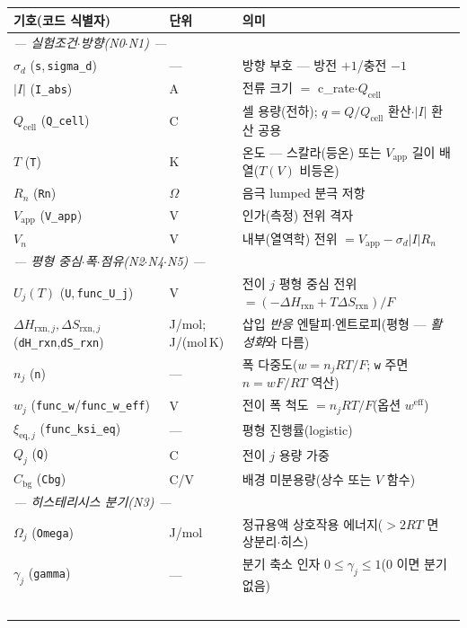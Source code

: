 \documentclass[11pt,a4paper]{article}
\newcommand{\eff}{\mathrm{eff}}
\newcommand{\eq}{\mathrm{eq}}
\newcommand{\app}{\mathrm{app}}
\newcommand{\cell}{\mathrm{cell}}
\newcommand{\bg}{\mathrm{bg}}
\newcommand{\rxn}{\mathrm{rxn}}
\newcommand{\code}[1]{\texttt{#1}}
\begin{document}
\newpage
\begingroup{}\setlength{\parskip}{0pt}\footnotesize\selectfont
\setlength{\LTpre}{0pt}\setlength{\LTpost}{\medskipamount}%
\begin{longtable}{p{} p{} p{}}
\toprule 기호(코드 식별자) & 단위 & 의미 \\ \midrule \endhead
\multicolumn{3}{l}{\emph{— 실험조건$\cdot$방향(N0$\cdot$N1) —}}\\
$\sigma_d$ (\code{s},\,\code{sigma\_d}) & --- & 방향 부호 — 방전 $+1$/충전 $-1$ \\
$|I|$ (\code{I\_abs}) & A & 전류 크기 $=$ c\_rate$\cdot Q_\cell$ \\
$Q_\cell$ (\code{Q\_cell}) & C & 셀 용량(전하); $q=Q/Q_\cell$ 환산$\cdot$$|I|$ 환산 공용 \\
$T$ (\code{T}) & K & 온도 — 스칼라(등온) 또는 $V_\app$ 길이 배열($T(V)$ 비등온) \\
$R_n$ (\code{Rn}) & $\Omega$ & 음극 lumped 분극 저항 \\
$V_\app$ (\code{V\_app}) & V & 인가(측정) 전위 격자 \\
$V_n$ & V & 내부(열역학) 전위 $=V_\app-\sigma_d|I|R_n$ \\
\multicolumn{3}{l}{\emph{— 평형 중심$\cdot$폭$\cdot$점유(N2$\cdot$N4$\cdot$N5) —}}\\
$U_j(T)$ (\code{U},\,\code{func\_U\_j}) & V & 전이 $j$ 평형 중심 전위 $=(-\Delta H_\rxn+T\Delta S_\rxn)/F$ \\
$\Delta H_{\rxn,j},\Delta S_{\rxn,j}$ (\code{dH\_rxn},\code{dS\_rxn}) & {\footnotesize J/mol;\,J/(mol\,K)} & 삽입 \emph{반응} 엔탈피$\cdot$엔트로피(평형 — \emph{활성화}와 다름) \\
$n_j$ (\code{n}) & --- & 폭 다중도($w=n_jRT/F$; \code{w} 주면 $n=wF/RT$ 역산) \\
$w_j$ (\code{func\_w}/\code{func\_w\_eff}) & V & 전이 폭 척도 $=n_jRT/F$(옵션 $w^\eff$) \\
$\xi_{\eq,j}$ (\code{func\_ksi\_eq}) & --- & 평형 진행률(logistic) \\
$Q_j$ (\code{Q}) & C & 전이 $j$ 용량 가중 \\
$C_\bg$ (\code{Cbg}) & C/V & 배경 미분용량(상수 또는 $V$ 함수) \\
\multicolumn{3}{l}{\emph{— 히스테리시스 분기(N3) —}}\\
$\Omega_j$ (\code{Omega}) & J/mol & 정규용액 상호작용 에너지($>2RT$ 면 상분리$\cdot$히스) \\
$\gamma_j$ (\code{gamma}) & --- & 분기 축소 인자 $0\le\gamma_j\le1$($0$ 이면 분기 없음) \\
$$
\end{longtable}
\end{document}
